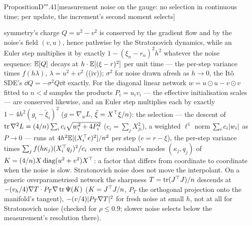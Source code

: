 \begin{thm}{Proposition}{D$'''$.41}[measurement noise on the gauge: no selection in continuous time; per update, the
increment's second moment selects]
\begin{enumerate}[label=\textup{(\roman*)}]
    symmetry's charge $Q = u^2 - v^2$ is conserved by the gradient flow and by the noise's field $(v,u)$, hence
    pathwise by the Stratonovich dynamics, while an Euler step multiplies it by exactly $1 - (\xi_n - r_n)^2h^2$
    whatever the noise sequence: $\mathbb{E}[Q]$ decays at $h\cdot\mathbb{E}[(\xi - r)^2]$ per unit time --- the per-step variance times
    $f(h\lambda)$, $\lambda = u^2 + v^2$ ((iv)); $\sigma^2$ for noise drawn afresh as $h\to0$, the It\^o SDE's
    $\dd Q = -\sigma^2Q\dd t$ exactly. For the diagonal linear network $w = u\odot u - v\odot v$ fitted to $n < d$
    samples the products $P_i = u_iv_i$ --- the effective initialisation scales --- are conserved likewise, and an Euler
    step multiplies each by exactly $1 - 4h^2(g_i - \tilde\xi_i)^2$ ($g = \nabla_wL$, $\tilde\xi = X^\top\xi/n$): the
    selection --- the descent of $\operatorname{tr}\nabla^2L = (4/n)\sum_ic_i\sqrt{w_i^2 + 4P_i^2}$ ($c_i = \sum_jX_{ji}^2$), a
    weighted $\ell^1$ norm $\sum_ic_i\lvert w_i\rvert$ as $P\to0$ --- runs at $4h^2\mathbb{E}[(X_i^\top e)^2]/n^2$ per step
    ($e = r - \xi$), the per-step variance times $\sum_jf(h\kappa_j)(X_i^\top q_j)^2/c_i$ over the residual's modes
    $(\kappa_j,q_j)$ of $K = (4/n)X\operatorname{diag}(u^2 + v^2)X^\top$: a factor that differs from coordinate to
    coordinate when the noise is slow. Stratonovich noise does not move the interpolant. On a generic overparametrised
    network the sharpness $T = \operatorname{tr}(J^\top J)/n$ descends at $-(v_h/4)\nabla T\cdot P_T\nabla\operatorname{tr}\Psi(K)$
    ($K = J^\top J/n$, $P_T$ the orthogonal projection onto the manifold's tangent), $-(v/4)\lvert P_T\nabla T\rvert^2$ for
    fresh noise at small $h$, not at all for Stratonovich noise (checked for $\rho\le0.9$; slower noise selects below
    the measurement's resolution there).
\end{enumerate}
\end{thm}

